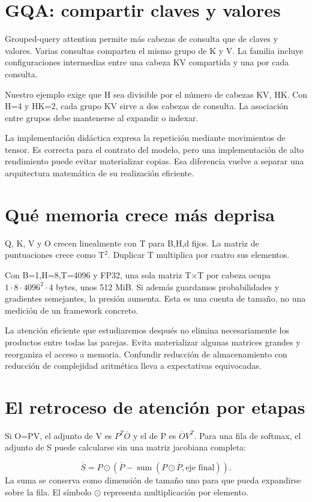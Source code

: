 \documentclass[12pt,a4paper,oneside]{report}
\begin{document}
\section{GQA: compartir claves y valores}
Grouped-query attention permite más cabezas de consulta que de claves y valores. Varias consultas comparten el mismo grupo de K y V. La familia incluye configuraciones intermedias entre una cabeza KV compartida y una por cada consulta. \cite{gqa}

Nuestro ejemplo exige que H sea divisible por el número de cabezas KV, HK. Con H=4 y HK=2, cada grupo KV sirve a dos cabezas de consulta. La asociación entre grupos debe mantenerse al expandir o indexar.

La implementación didáctica expresa la repetición mediante movimientos de tensor. Es correcta para el contrato del modelo, pero una implementación de alto rendimiento puede evitar materializar copias. Esa diferencia vuelve a separar una arquitectura matemática de su realización eficiente.

\section{Qué memoria crece más deprisa}
Q, K, V y O crecen linealmente con T para B,H,d fijos. La matriz de puntuaciones crece como T\ensuremath{^2}. Duplicar T multiplica por cuatro sus elementos.

Con B=1,H=8,T=4096 y FP32, una sola matriz T\ensuremath{\times}T por cabeza ocupa $1\cdot8\cdot4096^2\cdot4$ bytes, unos 512 MiB. Si además guardamos probabilidades y gradientes semejantes, la presión aumenta. Esta es una cuenta de tamaño, no una medición de un framework concreto.

La atención eficiente que estudiaremos después no elimina necesariamente los productos entre todas las parejas. Evita materializar algunas matrices grandes y reorganiza el acceso a memoria. Confundir reducción de almacenamiento con reducción de complejidad aritmética lleva a expectativas equivocadas.

\section{El retroceso de atención por etapas}
Si O=PV, el adjunto de V es $P^T\overline O$ y el de P es $\overline O V^T$. Para una fila de softmax, el adjunto de S puede calcularse sin una matriz jacobiana completa:

\[
\overline S=P\odot\left(\overline P-
\operatorname{sum}(P\odot\overline P,\text{eje final})\right).
\]
La suma se conserva como dimensión de tamaño uno para que pueda expandirse sobre la fila. El símbolo $\odot$ representa multiplicación por elemento.
\end{document}
